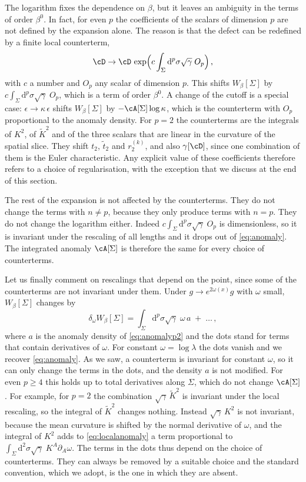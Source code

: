\documentclass[a4paper,11pt]{article}
\newcommand{\Kt}{\widetilde{K}}
\newcommand{\dd}{\mathrm{d}}
\begin{document}
The logarithm fixes the dependence on $\beta$, but it leaves an ambiguity in the terms of order $\beta^0$. In fact, for even $p$ the coefficients of the scalars of dimension $p$ are not defined by the expansion alone. The reason is that the defect can be redefined by a finite local counterterm,
	\begin{equation}\label{eq:counterterm}
		\cD\to\cD\,\exp\Bigl(c\int_\Sigma\dd^p\sigma\sqrt\gamma\;O_p\Bigr)\, ,
	\end{equation}
	with $c$ a number and $O_p$ any scalar of dimension $p$. This shifts $W_\beta[\Sigma]$ by $c\int_\Sigma\dd^p\sigma\sqrt\gamma\;O_p$, which is a term of order $\beta^0$. A change of the cutoff is a special case: $\epsilon\to\kappa\,\epsilon$ shifts $W_\beta[\Sigma]$ by $-\cA[\Sigma]\log\kappa$, which is the counterterm with $O_p$ proportional to the anomaly density. For $p=2$ the counterterms are the integrals of $K^2$, of $\Kt^2$ and of the three scalars that are linear in the curvature of the spatial slice. They shift $t_2$, $\tilde t_2$ and $r_2^{(k)}$, and also $\gamma[\cD]$, since one combination of them is the Euler characteristic. Any explicit value of these coefficients therefore refers to a choice of regularisation, with the exception that we discuss at the end of this section.

The rest of the expansion is not affected by the counterterms. They do not change the terms with $n\neq p$, because they only produce terms with $n=p$. They do not change the logarithm either. Indeed $c\int_\Sigma\dd^p\sigma\sqrt\gamma\;O_p$ is dimensionless, so it is invariant under the rescaling of all lengths and it drops out of \eqref{eq:anomaly}. The integrated anomaly $\cA[\Sigma]$ is therefore the same for every choice of counterterms.

Let us finally comment on rescalings that depend on the point, since some of the counterterms are not invariant under them. Under $g\to e^{2\omega(x)}g$ with $\omega$ small, $W_\beta[\Sigma]$ changes by
\begin{equation}\label{eq:localanomaly}
	\delta_\omega W_\beta[\Sigma]=\int_\Sigma\dd^p\sigma\sqrt\gamma\;\omega\,a\;+\;\dots\, ,
\end{equation}
where $a$ is the anomaly density of \eqref{eq:anomalyp2} and the dots stand for terms that contain derivatives of $\omega$. For constant $\omega=\log\lambda$ the dots vanish and we recover \eqref{eq:anomaly}. As we saw, a counterterm is invariant for constant $\omega$, so it can only change the terms in the dots, and the density $a$ is not modified. For even $p\ge4$ this holds up to total derivatives along $\Sigma$, which do not change $\cA[\Sigma]$. For example, for $p=2$ the combination $\sqrt\gamma\,\Kt^2$ is invariant under the local rescaling, so the integral of $\Kt^2$ changes nothing. Instead $\sqrt\gamma\,K^2$ is not invariant, because the mean curvature is shifted by the normal derivative of $\omega$, and the integral of $K^2$ adds to \eqref{eq:localanomaly} a term proportional to $\int_\Sigma\dd^2\sigma\sqrt\gamma\;K^A\partial_A\omega$. The terms in the dots thus depend on the choice of counterterms. They can always be removed by a suitable choice and the standard convention, which we adopt, is the one in which they are absent.
\end{document}
